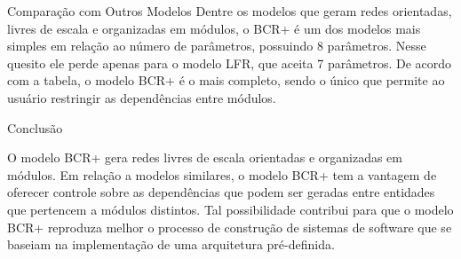 \begin{section}{Comparação com Outros Modelos}
	\vspace{8 mm}
	Dentre os modelos que geram redes orientadas, livres de escala e organizadas em módulos, o BCR+ é um dos modelos mais simples em relação ao número de parâmetros, possuindo 8 parâmetros. Nesse quesito ele perde apenas para o modelo LFR, que aceita 7 parâmetros. De acordo com a tabela, o modelo BCR+ é o mais completo, sendo o único que permite ao usuário restringir as dependências entre módulos.


\end{section}

\begin{section}{Conclusão}
	
	O modelo BCR+ gera redes livres de escala orientadas e organizadas em módulos. Em relação a modelos similares, o modelo BCR+ tem a vantagem de oferecer controle sobre as dependências que podem ser geradas entre entidades que pertencem a módulos distintos. Tal possibilidade contribui para que o modelo BCR+ reproduza melhor o processo de construção de sistemas de software que se baseiam na implementação de uma arquitetura pré-definida.
	
\end{section}